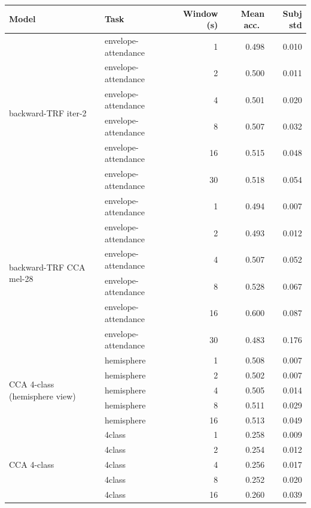 \begin{table}[ht]
\centering
\begin{tabular}{llrrr}
\toprule
Model & Task & Window (s) & Mean acc.\ & Subj std \\
\midrule
\multirow{6}{*}{backward-TRF iter-2}
& envelope-attendance & 1  & 0.498 & 0.010 \\
& envelope-attendance & 2  & 0.500 & 0.011 \\
& envelope-attendance & 4  & 0.501 & 0.020 \\
& envelope-attendance & 8  & 0.507 & 0.032 \\
& envelope-attendance & 16 & 0.515 & 0.048 \\
& envelope-attendance & 30 & 0.518 & 0.054 \\
\midrule
\multirow{6}{*}{backward-TRF CCA mel-28}
& envelope-attendance & 1  & 0.494 & 0.007 \\
& envelope-attendance & 2  & 0.493 & 0.012 \\
& envelope-attendance & 4  & 0.507 & 0.052 \\
& envelope-attendance & 8  & 0.528 & 0.067 \\
& envelope-attendance & 16 & 0.600 & 0.087 \\
& envelope-attendance & 30 & 0.483 & 0.176 \\
\midrule
\multirow{5}{*}{CCA 4-class (hemisphere view)}
& hemisphere & 1  & 0.508 & 0.007 \\
& hemisphere & 2  & 0.502 & 0.007 \\
& hemisphere & 4  & 0.505 & 0.014 \\
& hemisphere & 8  & 0.511 & 0.029 \\
& hemisphere & 16 & 0.513 & 0.049 \\
\midrule
\multirow{5}{*}{CCA 4-class}
& 4class & 1  & 0.258 & 0.009 \\
& 4class & 2  & 0.254 & 0.012 \\
& 4class & 4  & 0.256 & 0.017 \\
& 4class & 8  & 0.252 & 0.020 \\
& 4class & 16 & 0.260 & 0.039 \\
\bottomrule
\end{tabular}
\end{table}

